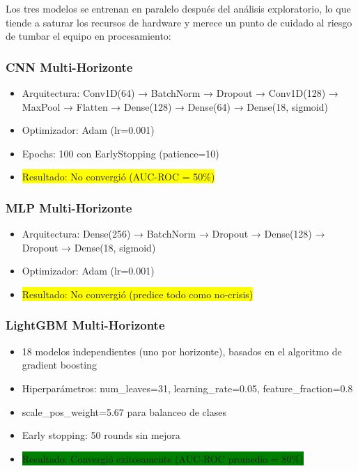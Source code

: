 Los tres modelos se entrenan en paralelo después del análisis exploratorio, lo que tiende a saturar los recursos de hardware y merece un punto de cuidado al riesgo de tumbar el equipo en procesamiento:

\subsubsection{CNN Multi-Horizonte}
\begin{itemize}
    \item Arquitectura: Conv1D(64) → BatchNorm → Dropout → Conv1D(128) → MaxPool → Flatten → Dense(128) → Dense(64) → Dense(18, sigmoid)
    \item Optimizador: Adam (lr=0.001)
    \item Epochs: 100 con EarlyStopping (patience=10)
    \item \colorbox{yellow}{Resultado: No convergió (AUC-ROC = 50\%)}
\end{itemize}

\subsubsection{MLP Multi-Horizonte}
\begin{itemize}
    \item Arquitectura: Dense(256) → BatchNorm → Dropout → Dense(128) → Dropout → Dense(18, sigmoid)
    \item Optimizador: Adam (lr=0.001)
    \item \colorbox{yellow}{Resultado: No convergió (predice todo como no-crisis)}
\end{itemize}

\subsubsection{LightGBM Multi-Horizonte}
\begin{itemize}
    \item 18 modelos independientes (uno por horizonte), basados en el algoritmo de gradient boosting \cite{ke2017lightgbm, friedman2001greedy}
    \item Hiperparámetros: num\_leaves=31, learning\_rate=0.05, feature\_fraction=0.8
    \item scale\_pos\_weight=5.67 para balanceo de clases
    \item Early stopping: 50 rounds sin mejora
    \item \colorbox{green}{Resultado: Convergió exitosamente (AUC-ROC promedio = 80\%)}
\end{itemize}

